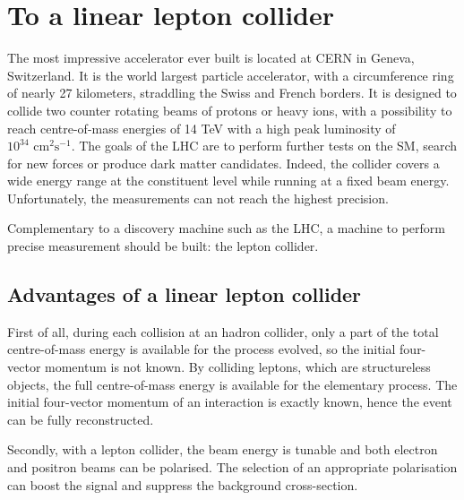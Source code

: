  \minitoc
  
  \section{To a linear lepton collider}
 
  The most impressive accelerator ever built is located at CERN in Geneva, Switzerland. 
  It is the world largest particle accelerator, with a circumference ring of nearly 27 kilometers, straddling the Swiss and French borders.
  It is designed to collide two counter rotating beams of protons or heavy ions, with a possibility to reach centre-of-mass energies of 14 TeV with a high peak luminosity of $10^{34} \text{ cm}^2 \text{s}^{-1}$.
  The goals of the \gls{LHC} are to perform further tests on the SM, search for new forces or produce dark matter candidates. 
  Indeed, the collider covers a wide energy range at the constituent level while running at a fixed beam energy.
  Unfortunately, the measurements can not reach the highest precision.
  
  Complementary to a discovery machine such as the \gls{LHC}, a machine to perform precise measurement should be built: the lepton collider.

    \subsection{Advantages of a linear lepton collider}
    
    First of all, during each collision at an hadron collider, only a part of the total centre-of-mass energy is available for the process evolved, so the initial four-vector momentum is not known. 
    By colliding leptons, which are structureless objects, the full centre-of-mass energy is available for the elementary process. 
    The initial four-vector momentum of an interaction is exactly known, hence the event can be fully reconstructed.

    Secondly, with a lepton collider, the beam energy is tunable and both electron and positron beams can be polarised. 
    The selection of an appropriate polarisation can boost the signal and suppress the background cross-section. 

